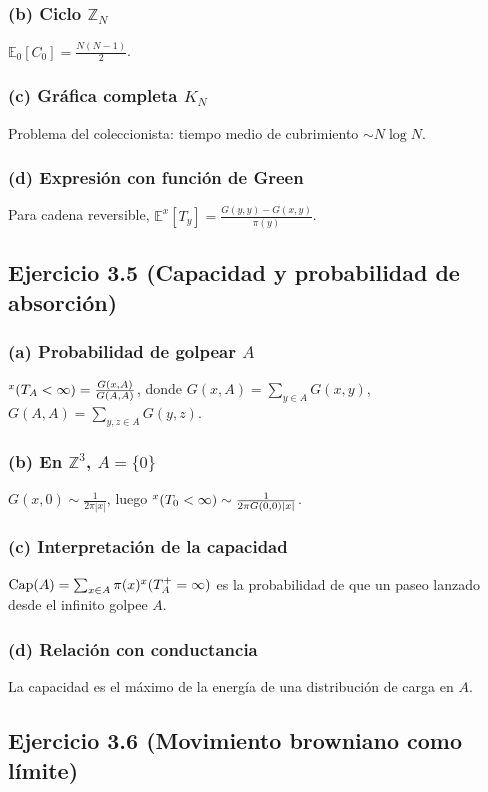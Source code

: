 \documentclass[12pt]{article}
\let\P\relax
\newcommand{\P}{\mathbb{P}}
\newcommand{\E}{\mathbb{E}}
\newcommand{\Z}{\mathbb{Z}}
\newcommand{\1}{\mathbf{1}}
\begin{document}
\subsubsection*{(b) Ciclo $\Z_N$}
$\E_0[C_0]=\frac{N(N-1)}{2}$.

\subsubsection*{(c) Gr\'afica completa $K_N$}
Problema del coleccionista: tiempo medio de cubrimiento $\sim N\log N$.

\subsubsection*{(d) Expresi\'on con funci\'on de Green}
Para cadena reversible, $\E^x[T_y]=\frac{G(y,y)-G(x,y)}{\pi(y)}$.

\subsection{Ejercicio 3.5 (Capacidad y probabilidad de absorci\'on)}

\subsubsection*{(a) Probabilidad de golpear $A$}
$\P^x(T_A<\infty)=\frac{G(x,A)}{G(A,A)}$, donde $G(x,A)=\sum_{y\in A}G(x,y)$, $G(A,A)=\sum_{y,z\in A}G(y,z)$.

\subsubsection*{(b) En $\Z^3$, $A=\{0\}$}
$G(x,0)\sim\frac{1}{2\pi|x|}$, luego $\P^x(T_0<\infty)\sim\frac{1}{2\pi G(0,0)|x|}$.

\subsubsection*{(c) Interpretaci\'on de la capacidad}
$\operatorname{Cap}(A)=\sum_{x\in A}\pi(x)\P^x(T_A^+=\infty)$ es la probabilidad de que un paseo lanzado desde el infinito golpee $A$.

\subsubsection*{(d) Relaci\'on con conductancia}
La capacidad es el m\'aximo de la energ\'ia de una distribuci\'on de carga en $A$.

\subsection{Ejercicio 3.6 (Movimiento browniano como l\'imite)}
\end{document}
